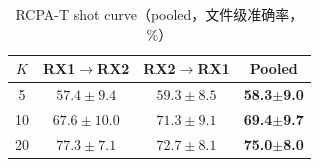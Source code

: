 \begin{table}[htbp]
  \centering
  \caption{RCPA-T shot curve（pooled，文件级准确率，\%）}
  \label{tab:ch4_rcpa}
  \begin{tabular}{cccc}
    \toprule
    $K$ & RX1$\rightarrow$RX2 & RX2$\rightarrow$RX1 & Pooled \\
    \midrule
    5 & $57.4\pm9.4$ & $59.3\pm8.5$ & \textbf{58.3$\pm$9.0} \\
    10 & $67.6\pm10.0$ & $71.3\pm9.1$ & \textbf{69.4$\pm$9.7} \\
    20 & $77.3\pm7.1$ & $72.7\pm8.1$ & \textbf{75.0$\pm$8.0} \\
    \bottomrule
  \end{tabular}
\end{table}

